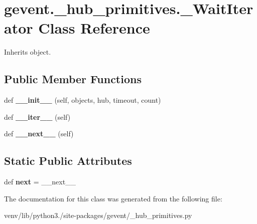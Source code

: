 \hypertarget{classgevent_1_1__hub__primitives_1_1___wait_iterator}{}\section{gevent.\+\_\+hub\+\_\+primitives.\+\_\+\+Wait\+Iterator Class Reference}
\label{classgevent_1_1__hub__primitives_1_1___wait_iterator}


Inherits object.

\subsection*{Public Member Functions}
\begin{DoxyCompactItemize}
\item 
\mbox{\label{classgevent_1_1__hub__primitives_1_1___wait_iterator_ad60f9bf4f9a69a7c784f2000ec0be0c8}} 
def {\bfseries \+\_\+\+\_\+init\+\_\+\+\_\+} (self, objects, hub, timeout, count)
\item 
\mbox{\label{classgevent_1_1__hub__primitives_1_1___wait_iterator_ad4593bae211f2d94a70afdddaf431ecb}} 
def {\bfseries \+\_\+\+\_\+iter\+\_\+\+\_\+} (self)
\item 
\mbox{\label{classgevent_1_1__hub__primitives_1_1___wait_iterator_ab6f027c7ea133cd9e9d09516001fab84}} 
def {\bfseries \+\_\+\+\_\+next\+\_\+\+\_\+} (self)
\end{DoxyCompactItemize}
\subsection*{Static Public Attributes}
\begin{DoxyCompactItemize}
\item 
\mbox{\label{classgevent_1_1__hub__primitives_1_1___wait_iterator_aff168da8958739de421f421fc9a2b0a4}} 
def {\bfseries next} = \+\_\+\+\_\+next\+\_\+\+\_\+
\end{DoxyCompactItemize}


The documentation for this class was generated from the following file\+:\begin{DoxyCompactItemize}
\item 
venv/lib/python3./site-\/packages/gevent/\+\_\+hub\+\_\+primitives.\+py\end{DoxyCompactItemize}
